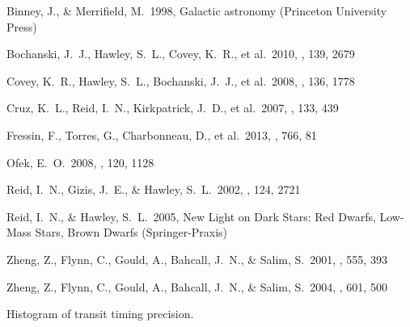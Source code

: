 \documentclass{emulateapj}
\begin{document}
\begin{thebibliography}{}

 Binney, J.,
  \& Merrifield, M.\ 1998, Galactic astronomy (Princeton University
  Press)

 Bochanski,
  J.~J., Hawley, S.~L., Covey, K.~R., et al.\ 2010, \aj, 139, 2679


 Covey, K.~R.,
  Hawley, S.~L., Bochanski, J.~J., et al.\ 2008, \aj, 136, 1778

 Cruz, K.~L., Reid,
  I.~N., Kirkpatrick, J.~D., et al.\ 2007, \aj, 133, 439
   
 Fressin, F., Torres, 
G., Charbonneau, D., et al.\ 2013, \apj, 766, 81 

 Ofek, E.~O.\ 2008, \pasp, 120, 
1128 

 Reid, I.~N., Gizis,
  J.~E., \& Hawley, S.~L.\ 2002, \aj, 124, 2721

 Reid, I.~N., \&
  Hawley, S.~L.\ 2005, New Light on Dark Stars: Red Dwarfs, Low-Mass
  Stars, Brown Dwarfs (Springer-Praxis)

 Zheng, Z., Flynn,
  C., Gould, A., Bahcall, J.~N., \& Salim, S.\ 2001, \apj, 555, 393

 Zheng, Z., Flynn,
  C., Gould, A., Bahcall, J.~N., \& Salim, S.\ 2004, \apj, 601, 500

\end{thebibliography}


Histogram of transit timing precision.
\end{document}
